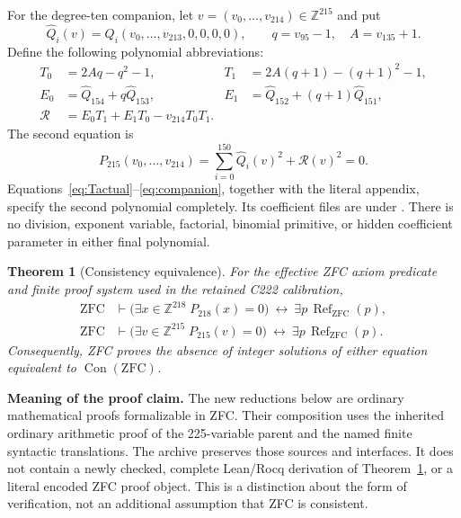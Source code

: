 \documentclass[11pt,letterpaper]{article}
\newtheorem{theorem}{Theorem}[section]
\theoremstyle{definition}\newtheorem{definition}[theorem]{Definition}
\theoremstyle{remark}\newtheorem{remark}[theorem]{Remark}
\newcommand{\Z}{\mathbb Z}\newcommand{\N}{\mathbb N}
\newcommand{\Con}{\operatorname{Con}}
\newcommand{\ZFC}{\mathrm{ZFC}}
\newcommand{\Refut}{\operatorname{Ref}}
\newcommand{\code}[1]{\texttt{\detokenize{#1}}}
\newcommand{\Pq}{P_{218}}\newcommand{\Pd}{P_{215}}
\begin{document}
For the degree-ten companion, let $v=(v_0,\ldots,v_{214})\in\Z^{215}$ and put
\[
 \widehat Q_i(v)=Q_i(v_0,\ldots,v_{213},0,0,0,0),\qquad
 q=v_{95}-1,\quad A=v_{135}+1.
\]
Define the following polynomial abbreviations:
\begin{align}
 T_0&=2Aq-q^2-1,&T_1&=2A(q+1)-(q+1)^2-1,\label{eq:Tactual}\\
 E_0&=\widehat Q_{154}+q\widehat Q_{153},&
 E_1&=\widehat Q_{152}+(q+1)\widehat Q_{151},\label{eq:Eactual}\\
 \mathcal R&=E_0T_1+E_1T_0-v_{214}T_0T_1.\label{eq:Ractual}
\end{align}
The second equation is
\begin{equation}\label{eq:companion}
 \boxed{\Pd(v_0,\ldots,v_{214})=
   \sum_{i=0}^{150}\widehat Q_i(v)^2+\mathcal R(v)^2=0.}
\end{equation}
Equations~\eqref{eq:Tactual}--\eqref{eq:companion}, together with the
literal appendix, specify the second polynomial completely. Its
coefficient files are under \code{equations/decic215/}. There is no
division, exponent variable, factorial, binomial primitive, or hidden
coefficient parameter in either final polynomial.

\begin{theorem}[Consistency equivalence]\label{thm:main}
For the effective ZFC axiom predicate and finite proof system used in
the retained C222 calibration,
\begin{align*}
 \ZFC&\vdash
 \bigl(\exists x\in\Z^{218}\;\Pq(x)=0\bigr)
       \ \longleftrightarrow\ \exists p\,\Refut_{\ZFC}(p),\\
 \ZFC&\vdash
 \bigl(\exists v\in\Z^{215}\;\Pd(v)=0\bigr)
       \ \longleftrightarrow\ \exists p\,\Refut_{\ZFC}(p).
\end{align*}
Consequently, ZFC proves the absence of integer solutions of either
equation equivalent to $\Con(\ZFC)$.
\end{theorem}

\textbf{Meaning of the proof claim.} The new reductions below are
ordinary mathematical proofs formalizable in ZFC. Their composition uses
the inherited ordinary arithmetic proof of the 225-variable parent and
the named finite syntactic translations. The archive preserves those
sources and interfaces. It does not contain a newly checked, complete
Lean/Rocq derivation of Theorem~\ref{thm:main}, or a literal encoded ZFC
proof object. This is a distinction about the form of verification, not
an additional assumption that ZFC is consistent.
\end{document}
